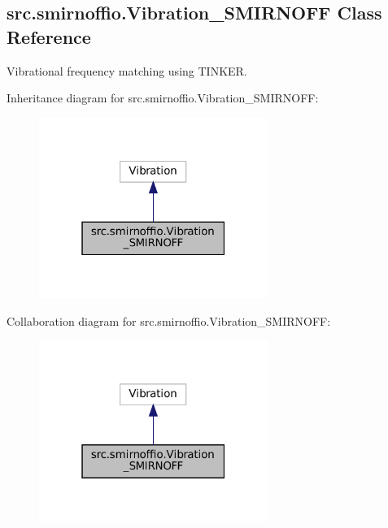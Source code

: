 \hypertarget{classsrc_1_1smirnoffio_1_1Vibration__SMIRNOFF}{}\subsection{src.\+smirnoffio.\+Vibration\+\_\+\+S\+M\+I\+R\+N\+O\+FF Class Reference}
\label{classsrc_1_1smirnoffio_1_1Vibration__SMIRNOFF}


Vibrational frequency matching using T\+I\+N\+K\+ER.  




Inheritance diagram for src.\+smirnoffio.\+Vibration\+\_\+\+S\+M\+I\+R\+N\+O\+FF\+:
\nopagebreak
\begin{figure}[H]
\begin{center}
\leavevmode
\includegraphics[width=211pt]{classsrc_1_1smirnoffio_1_1Vibration__SMIRNOFF__inherit__graph}
\end{center}
\end{figure}


Collaboration diagram for src.\+smirnoffio.\+Vibration\+\_\+\+S\+M\+I\+R\+N\+O\+FF\+:
\nopagebreak
\begin{figure}[H]
\begin{center}
\leavevmode
\includegraphics[width=211pt]{classsrc_1_1smirnoffio_1_1Vibration__SMIRNOFF__coll__graph}
\end{center}
\end{figure}
